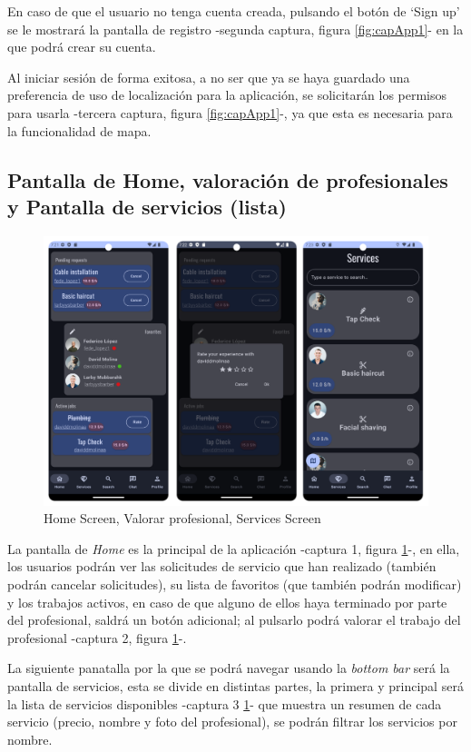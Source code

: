 En caso de que el usuario no tenga cuenta creada, pulsando el botón de ‘Sign up’ se le mostrará la pantalla de registro -segunda captura, figura \ref{fig:capApp1}- en la que podrá crear su cuenta.

Al iniciar sesión de forma exitosa, a no ser que ya se haya guardado una preferencia de uso de localización para la aplicación, se solicitarán los permisos para usarla -tercera captura, figura \ref{fig:capApp1}-, ya que esta es necesaria para la funcionalidad de mapa.
\newpage
\subsection{Pantalla de Home, valoración de profesionales y Pantalla de servicios (lista)}
\begin{figure}[h]
	\centering
	\includegraphics[width = 1\textwidth]{Imagenes/capturasApp/home_rate_services.png}
	\caption{Home Screen, Valorar profesional, Services Screen}
	\label{fig:capApp2}
\end{figure}

La pantalla de \textit{Home} es la principal de la aplicación -captura 1, figura \ref{fig:capApp2}-, en ella, los usuarios podrán ver las solicitudes de servicio que han realizado (también podrán cancelar solicitudes), su lista de favoritos (que también podrán modificar) y los trabajos activos, en caso de que alguno de ellos haya terminado por parte del profesional, saldrá un botón adicional; al pulsarlo podrá valorar el trabajo del profesional -captura 2, figura \ref{fig:capApp2}-.

La siguiente panatalla por la que se podrá navegar usando la \textit{bottom bar} será la pantalla de servicios, esta se divide en distintas partes, la primera y principal será la lista de servicios disponibles -captura 3 \ref{fig:capApp2}- que muestra un resumen de cada servicio (precio, nombre y foto del profesional), se podrán filtrar los servicios por nombre.
\newpage

